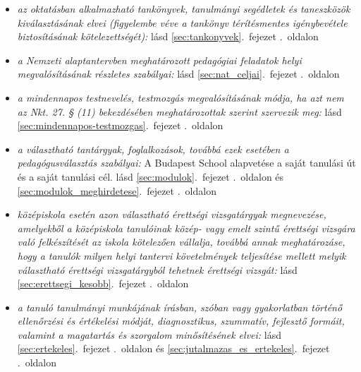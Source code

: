 \begin{itemize}
\item \emph{az oktatásban alkalmazható tankönyvek, tanulmányi segédletek és taneszközök kiválasztásának elvei (figyelembe véve a tankönyv térítésmentes igénybevétele biztosításának kötelezettségét): }    
       lásd        \ref{sec:tankonyvek}.~fejezet .~oldalon
              
\item \emph{a Nemzeti alaptantervben meghatározott pedagógiai feladatok helyi megvalósításának részletes szabályai: }    
       lásd        \ref{sec:nat_celjai}.~fejezet .~oldalon
              
\item \emph{a mindennapos testnevelés, testmozgás megvalósításának módja, ha azt nem az Nkt. 27. § (11) bekezdésében meghatározottak szerint szervezik meg: }    
       lásd        \ref{sec:mindennapos-testmozgas}.~fejezet .~oldalon
              
\item \emph{a választható tantárgyak, foglalkozások, továbbá ezek esetében a pedagógusválasztás szabályai: }   A Budapest School alapvetése a saját tanulási út és a saját tanulási cél. 
       lásd        \ref{sec:modulok}.~fejezet .~oldalon és 
              \ref{sec:modulok_meghirdetese}.~fejezet .~oldalon
              
\item \emph{középiskola esetén azon választható érettségi vizsgatárgyak megnevezése, amelyekből a középiskola tanulóinak közép- vagy emelt szintű érettségi vizsgára való felkészítését az iskola kötelezően vállalja, továbbá annak meghatározáse, hogy a tanulók milyen helyi tantervi követelmények teljesítése mellett melyik választható érettségi vizsgatárgyból tehetnek érettségi vizsgát: }    
       lásd        \ref{sec:erettsegi_kesobb}.~fejezet .~oldalon
              
\item \emph{a tanuló tanulmányi munkájának írásban, szóban vagy gyakorlatban történő ellenőrzési és értékelési módját, diagnosztikus, szummatív, fejlesztő formáit, valamint a magatartás és szorgalom minősítésének elvei: }    
       lásd        \ref{sec:ertekeles}.~fejezet .~oldalon és 
              \ref{sec:jutalmazas_es_ertekeles}.~fejezet .~oldalon
              

\end{itemize}
